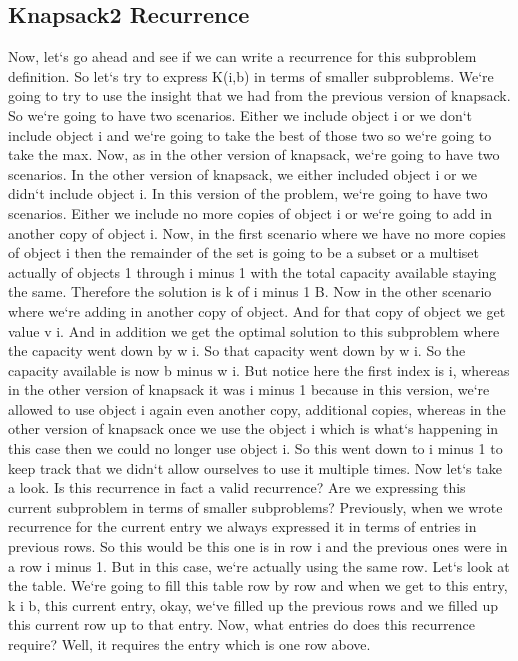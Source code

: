 \subsection{Knapsack2  Recurrence}
Now, let`s go ahead and see if we can write a recurrence for this subproblem definition.
So let`s try to express K(i,b) in terms of smaller subproblems.
We`re going to try to use the insight that we had from the previous version of knapsack.
So we`re going to have two scenarios.
Either we include object i or we don`t include object i and we`re going to take the best of those two so we`re going to take the max.
Now, as in the other version of knapsack, we`re going to have two scenarios.
In the other version of knapsack, we either included object i or we didn`t include object i.
In this version of the problem, we`re going to have two scenarios.
Either we include no more copies of object i or we`re going to add in another copy of object i.
Now, in the first scenario where we have no more copies of object i then the remainder of the set is going to be a subset or a multiset actually of objects 1 through i minus 1 with the total capacity available staying the same.
Therefore the solution is k of i minus 1 B\@.
Now in the other scenario where we`re adding in another copy of object.
And for that copy of object we get value v i.
And in addition we get the optimal solution to this subproblem where the capacity went down by w i.
So that capacity went down by w i.
So the capacity available is now b minus w i.
But notice here the first index is i, whereas in the other version of knapsack it was i minus 1 because in this version, we`re allowed to use object i again even another copy, additional copies, whereas in the other version of knapsack once we use the object i which is what`s happening in this case then we could no longer use object i.
So this went down to i minus 1 to keep track that we didn`t allow ourselves to use it multiple times.
Now let`s take a look.
Is this recurrence in fact a valid recurrence? Are we expressing this current subproblem in terms of smaller subproblems? Previously, when we wrote recurrence for the current entry we always expressed it in terms of entries in previous rows.
So this would be this one is in row i and the previous ones were in a row i minus 1.
But in this case, we`re actually using the same row.
Let`s look at the table.
We`re going to fill this table row by row and when we get to this entry, k i b, this current entry, okay, we`ve filled up the previous rows and we filled up this current row up to that entry.
Now, what entries do does this recurrence require? Well, it requires the entry which is one row above.
